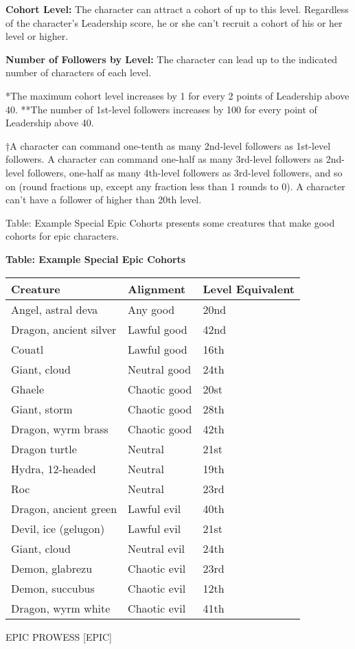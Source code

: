 \documentclass{article}
\begin{document}
\textbf{Cohort Level: }The character can attract a cohort of up to this level. 
Regardless of the character's Leadership score, he or she can't recruit a cohort 
of his or her level or higher. 

\textbf{Number of Followers by Level: }The character can lead up to the indicated 
number of characters of each level. 

*The maximum cohort level increases by 1 for every 2 points of Leadership above 
40. **The number of 1st-level followers increases by 100 for every point of Leadership 
above 40. 

†A character can command one-tenth as many 2nd-level followers as 1st-level followers. 
A character can command one-half as many 3rd-level followers as 2nd-level followers, 
one-half as many 4th-level followers as 3rd-level followers, and so on (round fractions 
up, except any fraction less than 1 rounds to 0). A character can't have a follower 
of higher than 20th level.

Table: Example Special Epic Cohorts presents some creatures that make good cohorts 
for epic characters. 

\vspace{12pt}
\textbf{Table: Example Special Epic Cohorts}

\begin{tabular}{|>{\raggedright}p{130pt}|>{\raggedright}p{78pt}|>{\raggedright}p{101pt}|}
\hline
C\textbf{reature} & A\textbf{lignment} & L\textbf{evel Equivalent}\tabularnewline
\hline
Angel, astral deva & Any good & 20nd\tabularnewline
\hline
Dragon, ancient silver & Lawful good & 42nd\tabularnewline
\hline
Couatl & Lawful good & 16th\tabularnewline
\hline
Giant, cloud & Neutral good & 24th\tabularnewline
\hline
Ghaele  & Chaotic good & 20st\tabularnewline
\hline
Giant, storm & Chaotic good & 28th\tabularnewline
\hline
Dragon, wyrm brass & Chaotic good & 42th\tabularnewline
\hline
Dragon turtle & Neutral & 21st\tabularnewline
\hline
Hydra, 12-headed & Neutral & 19th\tabularnewline
\hline
Roc & Neutral & 23rd\tabularnewline
\hline
Dragon, ancient green & Lawful evil & 40th\tabularnewline
\hline
Devil, ice (gelugon) & Lawful evil & 21st\tabularnewline
\hline
Giant, cloud & Neutral evil & 24th\tabularnewline
\hline
Demon, glabrezu & Chaotic evil & 23rd\tabularnewline
\hline
Demon, succubus & Chaotic evil & 12th\tabularnewline
\hline
Dragon, wyrm white & Chaotic evil & 41th\tabularnewline
\hline
\end{tabular}

\vspace{12pt}
EPIC PROWESS [EPIC] 
\end{document}

